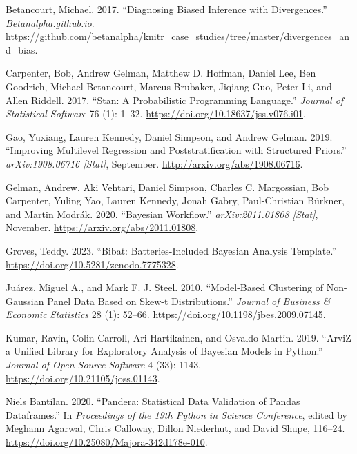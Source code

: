 \documentclass[
  letterpaper,
  DIV=11,
  numbers=noendperiod,
  oneside]{scrartcl}
\newlength{\cslhangindent}
\newenvironment{CSLReferences}[2] %
 {\begin{list}{}{%
  \setlength{\itemindent}{0pt}
  \setlength{\leftmargin}{0pt}
  \setlength{\parsep}{0pt}
  \ifodd #1
   \setlength{\leftmargin}{\cslhangindent}
   \setlength{\itemindent}{-1\cslhangindent}
  \fi
  \setlength{\itemsep}{#2\baselineskip}}}
 {\end{list}}
\theoremstyle{plain}
\theoremstyle{remark}
\begin{document}
\label{refs}
\begin{CSLReferences}{1}{0}
Betancourt, Michael. 2017. {``Diagnosing {Biased Inference} with
{Divergences}.''} \emph{Betanalpha.github.io}.
\url{https://github.com/betanalpha/knitr_case_studies/tree/master/divergences_and_bias}.

Carpenter, Bob, Andrew Gelman, Matthew D. Hoffman, Daniel Lee, Ben
Goodrich, Michael Betancourt, Marcus Brubaker, Jiqiang Guo, Peter Li,
and Allen Riddell. 2017. {``Stan: {A Probabilistic Programming
Language}.''} \emph{Journal of Statistical Software} 76 (1): 1--32.
\url{https://doi.org/10.18637/jss.v076.i01}.

Gao, Yuxiang, Lauren Kennedy, Daniel Simpson, and Andrew Gelman. 2019.
{``Improving Multilevel Regression and Poststratification with
Structured Priors.''} \emph{arXiv:1908.06716 {[}Stat{]}}, September.
\url{http://arxiv.org/abs/1908.06716}.

Gelman, Andrew, Aki Vehtari, Daniel Simpson, Charles C. Margossian, Bob
Carpenter, Yuling Yao, Lauren Kennedy, Jonah Gabry, Paul-Christian
Bürkner, and Martin Modrák. 2020. {``Bayesian Workflow.''}
\emph{arXiv:2011.01808 {[}Stat{]}}, November.
\url{https://arxiv.org/abs/2011.01808}.

Groves, Teddy. 2023. {``Bibat: Batteries-Included Bayesian Analysis
Template.''} \url{https://doi.org/10.5281/zenodo.7775328}.

Juárez, Miguel A., and Mark F. J. Steel. 2010. {``Model-{Based
Clustering} of {Non-Gaussian Panel Data Based} on {Skew-t
Distributions}.''} \emph{Journal of Business \& Economic Statistics} 28
(1): 52--66. \url{https://doi.org/10.1198/jbes.2009.07145}.

Kumar, Ravin, Colin Carroll, Ari Hartikainen, and Osvaldo Martin. 2019.
{``{ArviZ} a Unified Library for Exploratory Analysis of {Bayesian}
Models in {Python}.''} \emph{Journal of Open Source Software} 4 (33):
1143. \url{https://doi.org/10.21105/joss.01143}.

Niels Bantilan. 2020. {``Pandera: {Statistical Data Validation} of
{Pandas Dataframes}.''} In \emph{Proceedings of the 19th {Python} in
{Science Conference}}, edited by Meghann Agarwal, Chris Calloway, Dillon
Niederhut, and David Shupe, 116--24.
\url{https://doi.org/10.25080/Majora-342d178e-010}.


\end{CSLReferences}
\end{document}
